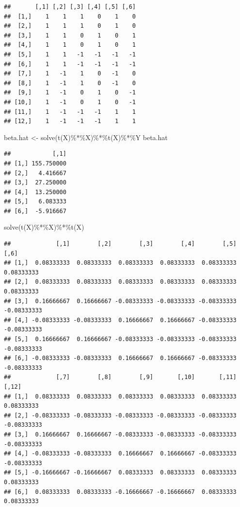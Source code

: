 \documentclass[
]{book}
\newenvironment{Shaded}{\begin{snugshade}}{\end{snugshade}}
\newcommand{\FunctionTok}[1]{\textcolor[rgb]{0.00,0.00,0.00}{#1}}
\newcommand{\NormalTok}[1]{#1}
\newcommand{\OtherTok}[1]{\textcolor[rgb]{0.56,0.35,0.01}{#1}}
\newcommand{\SpecialCharTok}[1]{\textcolor[rgb]{0.00,0.00,0.00}{#1}}
\begin{document}
\begin{verbatim}
##       [,1] [,2] [,3] [,4] [,5] [,6]
##  [1,]    1    1    1    0    1    0
##  [2,]    1    1    1    0    1    0
##  [3,]    1    1    0    1    0    1
##  [4,]    1    1    0    1    0    1
##  [5,]    1    1   -1   -1   -1   -1
##  [6,]    1    1   -1   -1   -1   -1
##  [7,]    1   -1    1    0   -1    0
##  [8,]    1   -1    1    0   -1    0
##  [9,]    1   -1    0    1    0   -1
## [10,]    1   -1    0    1    0   -1
## [11,]    1   -1   -1   -1    1    1
## [12,]    1   -1   -1   -1    1    1
\end{verbatim}

\begin{Shaded}
\begin{Highlighting}[]
\NormalTok{beta.hat }\OtherTok{\textless{}{-}} \FunctionTok{solve}\NormalTok{(}\FunctionTok{t}\NormalTok{(X)}\SpecialCharTok{\%*\%}\NormalTok{X)}\SpecialCharTok{\%*\%}\FunctionTok{t}\NormalTok{(X)}\SpecialCharTok{\%*\%}\NormalTok{Y}
\NormalTok{beta.hat}
\end{Highlighting}
\end{Shaded}

\begin{verbatim}
##            [,1]
## [1,] 155.750000
## [2,]   4.416667
## [3,]  27.250000
## [4,]  13.250000
## [5,]   6.083333
## [6,]  -5.916667
\end{verbatim}

\begin{Shaded}
\begin{Highlighting}[]
 \FunctionTok{solve}\NormalTok{(}\FunctionTok{t}\NormalTok{(X)}\SpecialCharTok{\%*\%}\NormalTok{X)}\SpecialCharTok{\%*\%}\FunctionTok{t}\NormalTok{(X)}
\end{Highlighting}
\end{Shaded}

\begin{verbatim}
##             [,1]        [,2]        [,3]        [,4]        [,5]        [,6]
## [1,]  0.08333333  0.08333333  0.08333333  0.08333333  0.08333333  0.08333333
## [2,]  0.08333333  0.08333333  0.08333333  0.08333333  0.08333333  0.08333333
## [3,]  0.16666667  0.16666667 -0.08333333 -0.08333333 -0.08333333 -0.08333333
## [4,] -0.08333333 -0.08333333  0.16666667  0.16666667 -0.08333333 -0.08333333
## [5,]  0.16666667  0.16666667 -0.08333333 -0.08333333 -0.08333333 -0.08333333
## [6,] -0.08333333 -0.08333333  0.16666667  0.16666667 -0.08333333 -0.08333333
##             [,7]        [,8]        [,9]       [,10]       [,11]       [,12]
## [1,]  0.08333333  0.08333333  0.08333333  0.08333333  0.08333333  0.08333333
## [2,] -0.08333333 -0.08333333 -0.08333333 -0.08333333 -0.08333333 -0.08333333
## [3,]  0.16666667  0.16666667 -0.08333333 -0.08333333 -0.08333333 -0.08333333
## [4,] -0.08333333 -0.08333333  0.16666667  0.16666667 -0.08333333 -0.08333333
## [5,] -0.16666667 -0.16666667  0.08333333  0.08333333  0.08333333  0.08333333
## [6,]  0.08333333  0.08333333 -0.16666667 -0.16666667  0.08333333  0.08333333
\end{verbatim}
\end{document}
